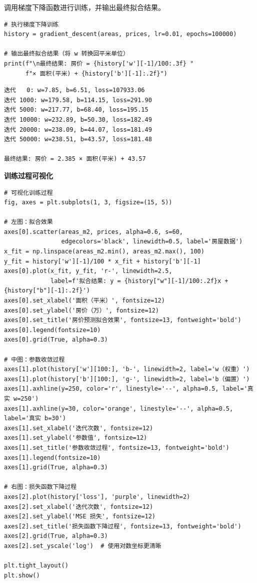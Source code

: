 \documentclass[10pt]{article}
\numberwithin{equation}{section}
\theoremstyle{plain}
\theoremstyle{definition}
\theoremstyle{remark}
\begin{document}
调用梯度下降函数进行训练，并输出最终拟合结果。

\begin{CodeBox}
	\begin{lstlisting}[style=PythonStyle]
# 执行梯度下降训练
history = gradient_descent(areas, prices, lr=0.01, epochs=100000)

# 输出最终拟合结果（将 w 转换回平米单位）
print(f"\n最终结果: 房价 = {history['w'][-1]/100:.3f} "
      f"× 面积(平米) + {history['b'][-1]:.2f}")
\end{lstlisting}
\end{CodeBox}

\begin{RemarkBox}[训练过程输出（部分）]
	\begin{verbatim}
迭代   0: w=7.85, b=6.51, loss=107933.06
迭代 1000: w=179.58, b=114.15, loss=291.90
迭代 5000: w=217.77, b=68.40, loss=195.15
迭代 10000: w=232.89, b=50.30, loss=182.49
迭代 20000: w=238.09, b=44.07, loss=181.49
迭代 50000: w=238.51, b=43.57, loss=181.48

最终结果: 房价 = 2.385 × 面积(平米) + 43.57
\end{verbatim}
\end{RemarkBox}

\textbf{训练过程可视化}

\begin{CodeBox}
	\begin{lstlisting}[style=PythonStyle]
# 可视化训练过程
fig, axes = plt.subplots(1, 3, figsize=(15, 5))

# 左图：拟合效果
axes[0].scatter(areas_m2, prices, alpha=0.6, s=60, 
                edgecolors='black', linewidth=0.5, label='房屋数据')
x_fit = np.linspace(areas_m2.min(), areas_m2.max(), 100)
y_fit = history['w'][-1]/100 * x_fit + history['b'][-1]
axes[0].plot(x_fit, y_fit, 'r-', linewidth=2.5, 
             label=f'拟合结果: y = {history["w"][-1]/100:.2f}x + {history["b"][-1]:.2f}')
axes[0].set_xlabel('面积（平米）', fontsize=12)
axes[0].set_ylabel('房价（万）', fontsize=12)
axes[0].set_title('房价预测拟合效果', fontsize=13, fontweight='bold')
axes[0].legend(fontsize=10)
axes[0].grid(True, alpha=0.3)

# 中图：参数收敛过程
axes[1].plot(history['w'][100:], 'b-', linewidth=2, label='w（权重）')
axes[1].plot(history['b'][100:], 'g-', linewidth=2, label='b（偏置）')
axes[1].axhline(y=250, color='r', linestyle='--', alpha=0.5, label='真实 w=250')
axes[1].axhline(y=30, color='orange', linestyle='--', alpha=0.5, label='真实 b=30')
axes[1].set_xlabel('迭代次数', fontsize=12)
axes[1].set_ylabel('参数值', fontsize=12)
axes[1].set_title('参数收敛过程', fontsize=13, fontweight='bold')
axes[1].legend(fontsize=10)
axes[1].grid(True, alpha=0.3)

# 右图：损失函数下降过程
axes[2].plot(history['loss'], 'purple', linewidth=2)
axes[2].set_xlabel('迭代次数', fontsize=12)
axes[2].set_ylabel('MSE 损失', fontsize=12)
axes[2].set_title('损失函数下降过程', fontsize=13, fontweight='bold')
axes[2].grid(True, alpha=0.3)
axes[2].set_yscale('log')  # 使用对数坐标更清晰

plt.tight_layout()
plt.show()
\end{lstlisting}
\end{CodeBox}
\end{document}
